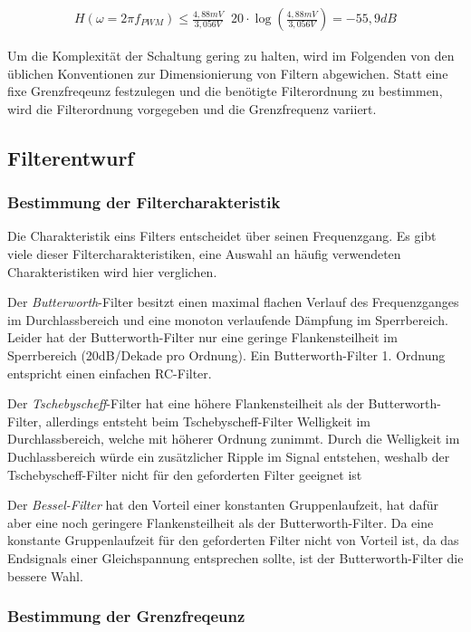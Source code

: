 \begin{align}
H(\omega=2\pi f_{PWM}) \le \frac{4,88mV}{3,056V} \mathop{\hat{=}} 20\cdot\log(\frac{4,88mV}{3,056V})= -55,9 dB
\label{eq:daempfung}
\end{align}

Um die Komplexität der Schaltung gering zu halten, wird im Folgenden von den üblichen Konventionen zur Dimensionierung von Filtern abgewichen.
Statt eine fixe Grenzfreqeunz festzulegen und die benötigte Filterordnung zu bestimmen, wird die Filterordnung vorgegeben und die Grenzfrequenz variiert.

\subsection{Filterentwurf}

\subsubsection{Bestimmung der Filtercharakteristik}

Die Charakteristik eins Filters entscheidet über seinen Frequenzgang. Es gibt viele dieser Filtercharakteristiken, eine Auswahl an häufig verwendeten Charakteristiken wird hier verglichen.

Der \emph{Butterworth}-Filter besitzt einen maximal flachen Verlauf des Frequenzganges im Durchlassbereich und eine monoton verlaufende Dämpfung im Sperrbereich.
Leider hat der Butterworth-Filter nur eine geringe Flankensteilheit im Sperrbereich (20dB/Dekade pro Ordnung). Ein Butterworth-Filter 1. Ordnung entspricht einen  einfachen RC-Filter.

Der \emph{Tschebyscheff}-Filter hat eine höhere Flankensteilheit als der Butterworth-Filter, allerdings entsteht beim Tschebyscheff-Filter Welligkeit im Durchlassbereich,
welche mit höherer Ordnung zunimmt. Durch die Welligkeit im Duchlassbereich würde ein zusätzlicher Ripple im Signal entstehen, weshalb der Tschebyscheff-Filter nicht
für den geforderten Filter geeignet ist 

Der \emph{Bessel-Filter} hat den Vorteil einer konstanten Gruppenlaufzeit, hat dafür aber eine noch geringere Flankensteilheit als der Butterworth-Filter.
Da eine konstante Gruppenlaufzeit für den geforderten Filter nicht von Vorteil ist, da das Endsignals einer Gleichspannung entsprechen sollte, ist der Butterworth-Filter
die bessere Wahl.


\subsubsection{Bestimmung der Grenzfreqeunz}

